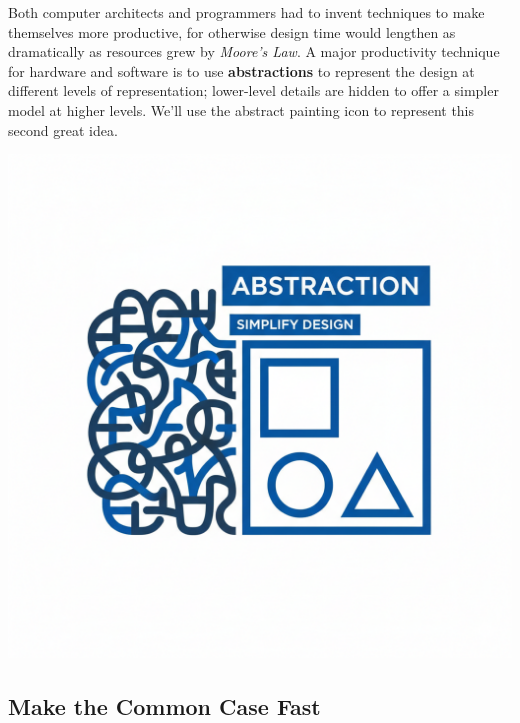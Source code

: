 \documentclass[a4paper,10pt]{article}
\begin{document}
\begin{minipage}[t]{0.7\linewidth}
Both computer architects and programmers had to invent techniques to make themselves more productive, for otherwise design time would lengthen as dramatically as resources grew by \textit{Moore's Law}. A major productivity technique for hardware and software is to use \textbf{abstractions} to represent the design at different levels of representation; lower-level details are hidden to offer a simpler model at higher levels. We'll use the abstract painting icon to represent this second great idea.
\end{minipage}
\hfill
\begin{minipage}[t]{0.28\linewidth}
    \centering
    \includegraphics[width=\linewidth]{resources/8_great_ideas_of_computer_architecture/abstraction.png}
\end{minipage}

\bigskip

\subsection{Make the Common Case Fast}
\end{document}

